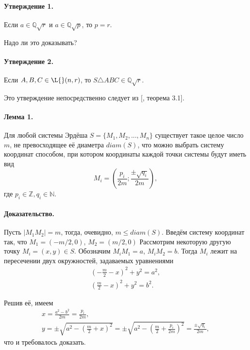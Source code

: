 \documentclass[a4paper,14pt]{article} %
\begin{document}
\paragraph{Утверждение 1.}
Если $a\in\mathbb{Q}\sqrt{r}$ и $a\in\mathbb{Q}\sqrt{p}$, то $p=r$.

Надо ли это доказывать?


\paragraph{Утверждение 2.}
Если $A,B,C\in\L{}(n,r)$, то $S\triangle ABC \in \mathbb{Q}\sqrt{r}$.

Это утверждение непосредственно следует из [\cite{polygons-on-lattices}, теорема 3.1].


\paragraph{Лемма 1.}

Для любой системы Эрдёша $S=\{M_1, M_2, ..., M_n\}$ существует такое целое число $m$, не превосходящее её диаметра $diam(S)$,
что можно выбрать систему координат способом, при котором координаты каждой точки системы будут иметь вид
\begin{equation}
	M_i = \left(
		\frac{p_i}{2m}
		;
		\frac{\pm\sqrt{q_i}}{2m}
	\right),
\end{equation}
где $p_i \in \mathbb{Z}, q_i \in \mathbb{N}$.


\paragraph{Доказательство.}
Пусть $|M_1 M_2| = m$, тогда, очевидно, $m \leq diam(S)$.
Введём систему координат так, что $M_1=(-m/2, 0)$, $M_2=(m/2, 0)$
Рассмотрим некоторую другую точку $M_i=(x, y)\in S$.
Обозначим $M_i M_1 = a$, $M_i M_2 = b$.
Тогда $M_i$ лежит на пересечении двух окружностей,
задаваемых уравнениями
\begin{gather}
	\left(-\frac{m}{2} - x\right)^2 + y ^2 = a^2,
\\
	\left( \frac{m}{2} - x\right)^2 + y ^2 = b^2.
\end{gather}

Решив её, имеем
\begin{gather}
	x = \frac{a^2 - b^2}{2 m} = \frac{p_i}{2m},
\\
	y = \pm\sqrt{a^2 - \left(\frac{m}{2}+x\right)^2} =
	\pm\sqrt{a^2 - \left(\frac{m}{2}+\frac{p_i}{2m}\right)^2} =
	\frac{\pm\sqrt{q_i}}{2m},
\end{gather}
что и требовалось доказать.
\end{document}
